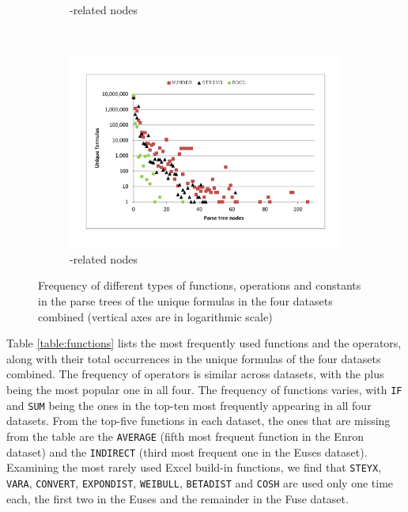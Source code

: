 \documentclass[times]{smrauth}
\begin{document}
\begin{figure}
\begin{subfigure}[b]{0.49\textwidth}
		\caption{-related nodes}
		\label{fig:nodesFunctions}
	\end{subfigure}
	~
	\begin{subfigure}[b]{0.49\textwidth}
		\centering
		\includegraphics[width=1\textwidth]{img/nodesConstants}
		\caption{-related nodes}
		\label{fig:nodesConstants}
	\end{subfigure}
	
	\caption{Frequency of different types of functions, operations and constants in the parse trees of the unique formulas in the four datasets combined (vertical axes are in logarithmic scale)}
\end{figure}

Table \ref{table:functions} lists the most frequently used functions and the operators, along with their total occurrences in the unique formulas of the four datasets combined. The frequency of operators is similar across datasets, with the plus being the most popular one in all four. The frequency of functions varies, with \texttt{IF} and \texttt{SUM} being the ones in the top-ten most frequently appearing in all four datasets. From the top-five functions in each dataset, the ones that are missing from the table are the \texttt{AVERAGE} (fifth most frequent function in the Enron dataset) and the \texttt{INDIRECT} (third most frequent one in the Euses dataset). Examining the most rarely used Excel build-in functions, we find that \texttt{STEYX}, \texttt{VARA}, \texttt{CONVERT}, \texttt{EXPONDIST}, \texttt{WEIBULL}, \texttt{BETADIST} and \texttt{COSH} are used only one time each, the first two in the Euses and the remainder in the Fuse dataset.
\end{document}
